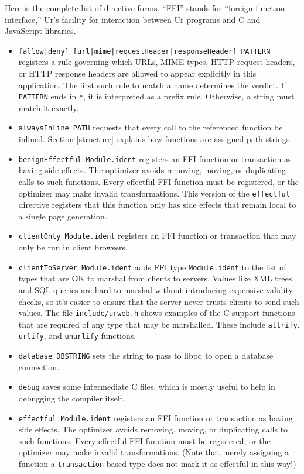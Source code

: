 \documentclass{article}
\begin{document}
Here is the complete list of directive forms.  ``FFI'' stands for ``foreign function interface,'' Ur's facility for interaction between Ur programs and C and JavaScript libraries.
\begin{itemize}
\item \texttt{[allow|deny] [url|mime|requestHeader|responseHeader] PATTERN} registers a rule governing which URLs, MIME types, HTTP request headers, or HTTP response headers are allowed to appear explicitly in this application.  The first such rule to match a name determines the verdict.  If \texttt{PATTERN} ends in \texttt{*}, it is interpreted as a prefix rule.  Otherwise, a string must match it exactly.
\item \texttt{alwaysInline PATH} requests that every call to the referenced function be inlined.  Section \ref{structure} explains how functions are assigned path strings.
\item \texttt{benignEffectful Module.ident} registers an FFI function or transaction as having side effects.  The optimizer avoids removing, moving, or duplicating calls to such functions.  Every effectful FFI function must be registered, or the optimizer may make invalid transformations.  This version of the \texttt{effectful} directive registers that this function only has side effects that remain local to a single page generation.
\item \texttt{clientOnly Module.ident} registers an FFI function or transaction that may only be run in client browsers.
\item \texttt{clientToServer Module.ident} adds FFI type \texttt{Module.ident} to the list of types that are OK to marshal from clients to servers.  Values like XML trees and SQL queries are hard to marshal without introducing expensive validity checks, so it's easier to ensure that the server never trusts clients to send such values.  The file \texttt{include/urweb.h} shows examples of the C support functions that are required of any type that may be marshalled.  These include \texttt{attrify}, \texttt{urlify}, and \texttt{unurlify} functions.
\item \texttt{database DBSTRING} sets the string to pass to libpq to open a database connection.
\item \texttt{debug} saves some intermediate C files, which is mostly useful to help in debugging the compiler itself.
\item \texttt{effectful Module.ident} registers an FFI function or transaction as having side effects.  The optimizer avoids removing, moving, or duplicating calls to such functions.  Every effectful FFI function must be registered, or the optimizer may make invalid transformations.  (Note that merely assigning a function a \texttt{transaction}-based type does not mark it as effectful in this way!)

\end{itemize}
\end{document}
